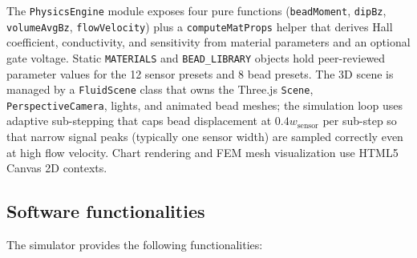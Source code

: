 \documentclass[preprint,12pt,a4paper]{elsarticle}
\begin{document}
The \texttt{PhysicsEngine} module exposes four pure functions (\texttt{beadMoment}, \texttt{dipBz}, \texttt{volumeAvgBz}, \texttt{flowVelocity}) plus a \texttt{computeMatProps} helper that derives Hall coefficient, conductivity, and sensitivity from material parameters and an optional gate voltage. Static \texttt{MATERIALS} and \texttt{BEAD\_LIBRARY} objects hold peer-reviewed parameter values for the 12 sensor presets and 8 bead presets. The 3D scene is managed by a \texttt{FluidScene} class that owns the Three.js \texttt{Scene}, \texttt{PerspectiveCamera}, lights, and animated bead meshes; the simulation loop uses adaptive sub-stepping that caps bead displacement at $0.4 w_{\text{sensor}}$ per sub-step so that narrow signal peaks (typically one sensor width) are sampled correctly even at high flow velocity. Chart rendering and FEM mesh visualization use HTML5 Canvas 2D contexts.

\subsection{Software functionalities}

The simulator provides the following functionalities:
\end{document}
